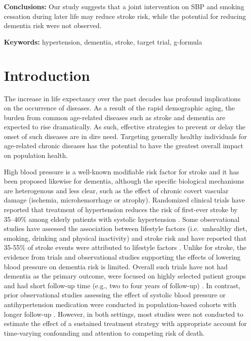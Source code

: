 \documentclass[
]{book}
\begin{document}
\textbf{Conclusions:} Our study suggests that a joint intervention on SBP and smoking cessation during later life may reduce stroke risk, while the potential for reducing dementia risk were not observed.

\textbf{Keywords:} hypertension, dementia, stroke, target trial, g-formula

\newpage

\hypertarget{introduction-1}{%
\section{Introduction}\label{introduction-1}}

The increase in life expectancy over the past decades has profound implications on the occurrence of diseases. As a result of the rapid demographic aging, the burden from common age-related diseases such as stroke and dementia are expected to rise dramatically\autocite{larson2008}. As such, effective strategies to prevent or delay the onset of such diseases are in dire need. Targeting generally healthy individuals for age-related chronic diseases has the potential to have the greatest overall impact on population health\autocite{bauer2014}.

High blood pressure is a well-known modifiable risk factor for stroke\autocite{johnson2019} and it has been proposed likewise for dementia\autocite{lancet2020}, although the specific biological mechanisms are heterogenous and less clear, such as the effect of chronic covert vascular damage (ischemia, microhemorrhage or atrophy)\autocite{hughes2020}. Randomized clinical trials have reported that treatment of hypertension reduces the risk of first-ever stroke by 35--40\% among elderly patients with systolic hypertension \autocite{ace_inhibitors2000,chobanian2003}. Some observational studies have assessed the association between lifestyle factors (i.e.~unhealthy diet, smoking, drinking and physical inactivity) and stroke risk and have reported that 35-55\% of stroke events were attributed to lifestyle factors \autocite{braillon2015,zhang2012,prince1996}. Unlike for stroke, the evidence from trials and observational studies supporting the effects of lowering blood pressure on dementia risk is limited. Overall such trials have not had dementia as the primary outcome, were focused on highly selected patient groups and had short follow-up time (e.g., two to four years of follow-up) \autocite{ace_inhibitors2000,prince1996,forette2002,progress2003,lithell2003,diener2008,anderson2011,williamson2019,ding2020}. In contrast, prior observational studies assessing the effect of systolic blood pressure or antihypertension medication were conducted in population-based cohorts with longer follow-up \autocite{ding2020,liang2018}. However, in both settings, most studies were not conducted to estimate the effect of a sustained treatment strategy with appropriate account for time-varying confounding and attention to competing risk of death.
\end{document}
